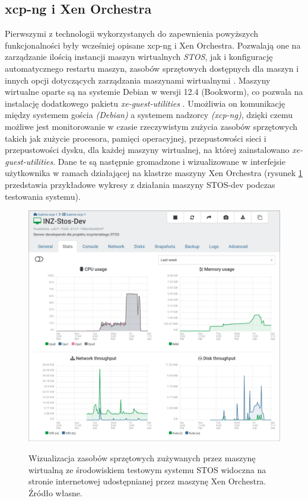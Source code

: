 \subsection{xcp-ng i Xen Orchestra}
Pierwszymi z technologii wykorzystanych do zapewnienia powyższych funkcjonalności były wcześniej opisane xcp-ng i Xen Orchestra. Pozwalają one na zarządzanie ilością instancji maszyn wirtualnych \textit{STOS}, jak i konfigurację automatycznego restartu maszyn, zasobów sprzętowych dostępnych dla maszyn i innych opcji dotyczących zarządzania maszynami wirtualnymi \cite{xoa, xcp}. Maszyny wirtualne oparte są na systemie Debian w wersji 12.4 (Bookworm), co pozwala na instalację dodatkowego pakietu \textit{xe-guest-utilities} \cite{xe-guest}. Umożliwia on komunikację między systemem gościa \textit{(Debian)} a systemem nadzorcy \textit{(xcp-ng)}, dzięki czemu możliwe jest monitorowanie w czasie rzeczywistym zużycia zasobów sprzętowych takich jak zużycie procesora, pamięci operacyjnej, przepustowości sieci i przepustowości dysku, dla każdej maszyny wirtualnej, na której zainstalowano \textit{xe-guest-utilities}. Dane te są następnie gromadzone i wizualizowane w interfejsie użytkownika w ramach działającej na klastrze maszyny Xen Orchestra (rysunek \ref{xcpGuest} przedstawia przykładowe wykresy z działania maszyny STOS-dev podczas testowania systemu).
\begin{figure}[!h]
	\begin{center}
		\resizebox{0.9\textwidth}{!} {
			\includegraphics{img/4/xe-dashboard.png}
		}
		\caption[Dashboard Xen Orchestra]{Wizualizacja zasobów sprzętowych zużywanych przez maszynę wirtualną ze środowiskiem testowym systemu STOS widoczna na stronie internetowej udostępnianej przez maszynę Xen Orchestra. Źródło własne.}
		\label{xcpGuest}
	\end{center}
\end{figure}
